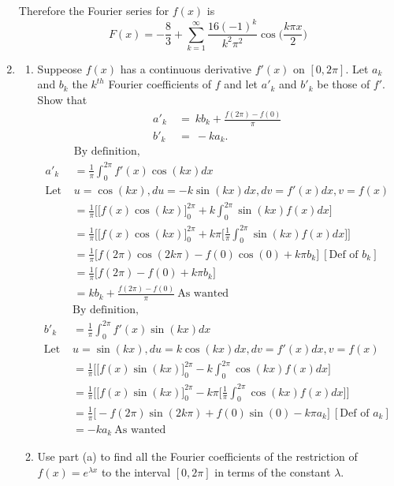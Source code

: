 \documentclass{article}
\begin{document}
\begin{enumerate}
    Therefore the Fourier series for $f(x)$ is 
        \[
            F(x) = - \frac{8}{3} + \sum_{k=1}^{\infty} \frac{16(-1)^k}{k^2\pi^2}\cos\Big(\frac{k\pi x}{2}\Big)
        \]
    \newpage
    \item
    \begin{enumerate}
        \item Suppeose $f(x)$ has a continuous derivative $f'(x)$ on $[0,2\pi]$. Let $a_k$ and $b_k$ the $k^{th}$ Fourier coefficients of $f$ and let $a'_k$ and $b'_k$ be those of $f'$. Show that
        \begin{align*}
            a'_k \: &= \: kb_k + \frac{f(2\pi)-f(0)}{\pi} \\
            b'_k \: &= \: -ka_k.
        \end{align*}
        \begin{align*}
            &\text{By definition, } \\
            a'_k &= \frac{1}{\pi}\int_{0}^{2\pi}f'(x)\cos(kx)dx\\
            \text{Let }&u = \cos(kx), du = -k\sin(kx)dx, dv = f'(x)dx , v = f(x) \\
            &= \frac{1}{\pi}\Bigg[\Big[f(x)\cos(kx)\Big]^{2\pi}_{0} + k\int_{0}^{2\pi}\sin(kx)f(x)dx\Bigg] \\
            &= \frac{1}{\pi} \Bigg[ \Big[ f(x)\cos(kx) \Big]^{2\pi}_{0}  + k\pi \Big[\frac{1}{\pi}\int_{0}^{2\pi}\sin(kx)f(x)dx\Big]\Bigg] \\            
            &= \frac{1}{\pi} \Bigg[ f(2\pi)\cos(2k\pi) - f(0)\cos(0) + k\pi b_k\Bigg] \: [\text{Def of $b_k$}] \\
            &= \frac{1}{\pi} \Bigg[ f(2\pi) - f(0) + k\pi b_k\Bigg] \\
            &= kb_k + \frac{f(2\pi) - f(0)}{\pi} \: \text{As wanted}
        \end{align*}
        \begin{align*}
            &\text{By definition, } \\
            b'_k &= \frac{1}{\pi}\int_{0}^{2\pi}f'(x)\sin(kx)dx\\
            \text{Let }&u = \sin(kx), du = k\cos(kx)dx, dv = f'(x)dx , v = f(x) \\
            &= \frac{1}{\pi}\Bigg[\Big[f(x)\sin(kx)\Big]^{2\pi}_{0} - k\int_{0}^{2\pi}\cos(kx)f(x)dx\Bigg] \\
            &= \frac{1}{\pi} \Bigg[ \Big[ f(x)\sin(kx) \Big]^{2\pi}_{0}  - k\pi \Big[\frac{1}{\pi}\int_{0}^{2\pi}\cos(kx)f(x)dx\Big]\Bigg] \\            
            &= \frac{1}{\pi} \Bigg[ -f(2\pi)\sin(2k\pi) + f(0)\sin(0) - k\pi a_k\Bigg] \: [\text{Def of $a_k$}] \\
            &= -ka_k \: \text{As wanted}
        \end{align*}
        \newpage
        \item Use part (a) to find all the Fourier coefficients of the restriction of $f(x) = e^{\lambda x}$ to the interval $[0,2\pi]$ in terms of the constant $\lambda$.

\end{enumerate}
\end{enumerate}
\end{document}
